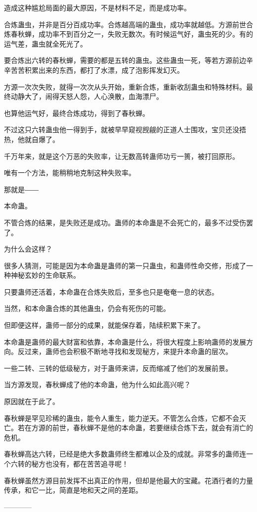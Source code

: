 \begin{this_body}
造成这种尴尬局面的最大原因，不是材料不足，而是成功率。

合炼蛊虫，并非是百分百成功率。合炼越高端的蛊虫，成功率就越低。方源前世合炼春秋蝉，成功率不到百分之一，失败无数次。有时候运气好，蛊虫死的少。有的运气差，蛊虫就全死光了。

要合炼出六转的春秋蝉，需要的都是五转的蛊虫。这些蛊虫一死，等若方源前边辛辛苦苦积累出来的东西，都打了水漂，成了泡影挥发幻灭。

方源一次次失败，就得一次次从头开始，重新合炼，重新收刮蛊虫和特殊材料。最终动静大了，闹得天怒人怨，人心涣散，血海漂尸。

也算他运气好，最终合炼成功，得到了春秋蝉。

不过这只六转蛊虫他一得到手，就被早早窥视觊觎的正道人士围攻，宝贝还没捂热，他就自爆了。

千万年来，就是这个万恶的失败率，让无数高转蛊师功亏一篑，被打回原形。

唯有一个方法，能稍稍地克制这种失败率。

那就是――

本命蛊。

不管合炼的结果，是失败还是成功。蛊师的本命蛊是不会死亡的，最多不过受伤罢了。

为什么会这样？

很多人猜测，可能是因为本命蛊是蛊师的第一只蛊虫，和蛊师性命交修，形成了一种神秘玄妙的生命联系。

只要蛊师还活着，本命蛊在合炼失败后，至多也只是奄奄一息的状态。

当然，和本命蛊合炼的其他蛊虫，仍会有死伤的可能。

但即便这样，蛊师一部分的成果，就能保存着，陆续积累下来了。

本命蛊是蛊师的最大财富和依靠，本命蛊是什么，将很大程度上影响蛊师的发展方向。反过来，蛊师也会积极不断地寻找和发现秘方，来提升本命蛊的层次。

一些二转、三转的低级秘方，对于蛊师来讲，反而缩减了他们的发展前景。

当方源发现，春秋蝉成了他的本命蛊，他为什么如此高兴呢？

原因就在于此了。

春秋蝉是罕见珍稀的蛊虫，能令人重生，能力逆天。不管怎么合炼，它都不会灭亡。若在方源的前世，春秋蝉不是他的本命蛊，若要继续合炼下去，就会有消亡的危机。

春秋蝉高达六转，已经是绝大多数蛊师终生都难以企及的成就。非常多的蛊师连一个六转的秘方也没有，都在苦苦追寻呢！

春秋蝉虽然方源目前发挥不出真正的作用，但却是他最大的宝藏。花酒行者的力量传承，和它一比，简直是地和天之间的差距。

------------

\end{this_body}

